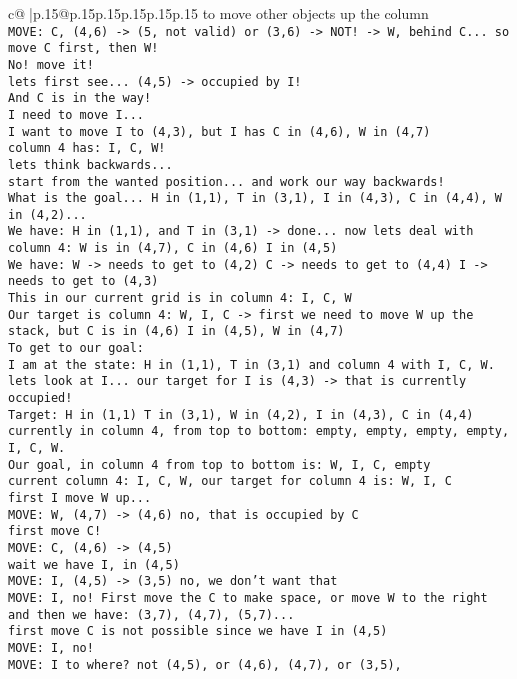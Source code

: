 \documentclass{article}
\begin{document}
{\begin{supertabular}{c@{$\;$}|p{.15\linewidth}@{}p{.15\linewidth}p{.15\linewidth}p{.15\linewidth}p{.15\linewidth}p{.15\linewidth}}
{{{to move other objects up the column\\ \tt  MOVE: C, (4,6) -> (5, not valid) or (3,6) -> NOT! -> W, behind C... so move C first, then W!\\ \tt  No! move it!\\ \tt  lets first see... (4,5) -> occupied by I!\\ \tt  And C is in the way!\\ \tt  I need to move I...\\ \tt  I want to move I to (4,3), but I has C in (4,6), W in (4,7)\\ \tt  column 4 has: I, C, W!\\ \tt  lets think backwards...\\ \tt  start from the wanted position... and work our way backwards!\\ \tt  What is the goal... H in (1,1), T in (3,1), I in (4,3), C in (4,4), W in (4,2)... \\ \tt  We have: H in (1,1), and T in (3,1) -> done... now lets deal with column 4: W is in (4,7), C in (4,6) I in (4,5)\\ \tt  We have: W -> needs to get to (4,2) C -> needs to get to (4,4) I -> needs to get to (4,3)\\ \tt  This in our current grid is in column 4: I, C, W\\ \tt  Our target is column 4: W, I, C -> first we need to move W up the stack, but C is in (4,6) I in (4,5), W in (4,7)\\ \tt  To get to our goal: \\ \tt  I am at the state: H in (1,1), T in (3,1) and column 4 with I, C, W.\\ \tt  lets look at I... our target for I is (4,3) -> that is currently occupied!\\ \tt  Target: H in (1,1) T in (3,1), W in (4,2), I in (4,3), C in (4,4) \\ \tt  currently in column 4, from top to bottom: empty, empty, empty, empty, I, C, W.\\ \tt  Our goal, in column 4 from top to bottom is: W, I, C, empty\\ \tt  current column 4: I, C, W, our target for column 4 is: W, I, C\\ \tt  first I move W up...\\ \tt  MOVE: W, (4,7) -> (4,6) no, that is occupied by C\\ \tt  first move C!\\ \tt  MOVE: C, (4,6) -> (4,5) \\ \tt  wait we have I, in (4,5)\\ \tt  MOVE: I, (4,5) -> (3,5) no, we don't want that\\ \tt  MOVE: I, no! First move the C to make space, or move W to the right and then we have: (3,7), (4,7), (5,7)...\\ \tt  first move C is not possible since we have I in (4,5) \\ \tt  MOVE: I, no! \\ \tt  MOVE: I to where? not (4,5), or (4,6), (4,7), or (3,5), }}}
\end{supertabular}}
\end{document}
